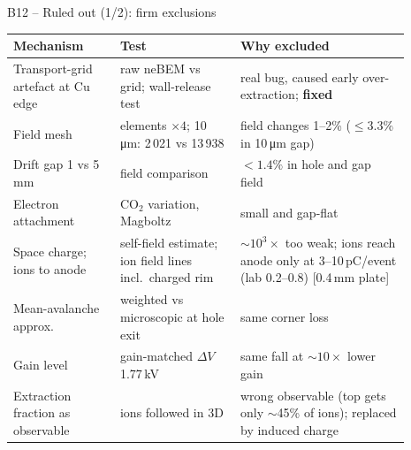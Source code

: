 \documentclass[aspectratio=169,11pt]{beamer}
\newcommand{\backlink}[1]{\hfill\hyperlink{#1}{\beamerreturnbutton{back}}}
\begin{document}
\begin{frame}[label=b-ruled1]{B12 -- Ruled out (1/2): firm exclusions}
  \centering\footnotesize
  \begin{tabular}{L{0.24\linewidth}L{0.27\linewidth}L{0.38\linewidth}}\toprule
    Mechanism & Test & Why excluded\\\midrule
    Transport-grid artefact at Cu edge & raw neBEM vs grid; wall-release test & real bug, caused early over-extraction; \textbf{fixed}\\
    Field mesh & elements $\times4$; 10\,\si{\micro m}: 2\,021 vs 13\,938 & field changes 1--2\% ($\le$3.3\% in 10\,\si{\micro m} gap)\\
    Drift gap 1 vs 5\,mm & field comparison & $<1.4\%$ in hole and gap field\\
    Electron attachment & CO$_2$ variation, Magboltz & small and gap-flat\\
    Space charge; ions to anode & self-field estimate; ion field lines incl.\ charged rim & $\sim10^3\times$ too weak; ions reach anode only at 3--10\,pC/event (lab 0.2--0.8) [0.4\,mm plate]\\
    Mean-avalanche approx. & weighted vs microscopic at hole exit & same corner loss\\
    Gain level & gain-matched $\Delta V$ 1.77\,kV & same fall at $\sim10\times$ lower gain\\
    Extraction fraction as observable & ions followed in 3D & wrong observable (top gets only $\sim$45\% of ions); replaced by induced charge\\\bottomrule
  \end{tabular}
  \backlink{m-ruled}\ \hyperlink{b-ruled2}{}
\end{frame}
\end{document}
